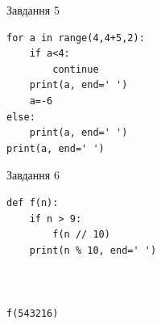 \documentclass[12pt, ukrainian]{article}
\begin{document}
{\vspace{15mm}
\begin{minipage}[t]{9.7cm}                
{\begin{center}Завдання {5}\end{center}}
\begin{verbatim}
for a in range(4,4+5,2):
    if a<4:
        continue
    print(a, end=' ')
    a=-6
else:
    print(a, end=' ')
print(a, end=' ')
\end{verbatim}     
\end{minipage}
\vline \hspace{8mm}
\begin{minipage}[t]{8.0cm}                
{\begin{center}Завдання {6}\end{center}}
\begin{verbatim}
def f(n):
    if n > 9:
        f(n // 10)
    print(n % 10, end=' ')
    


f(543216)
\end{verbatim}     
\end{minipage}

}
\newpage
\end{document}
